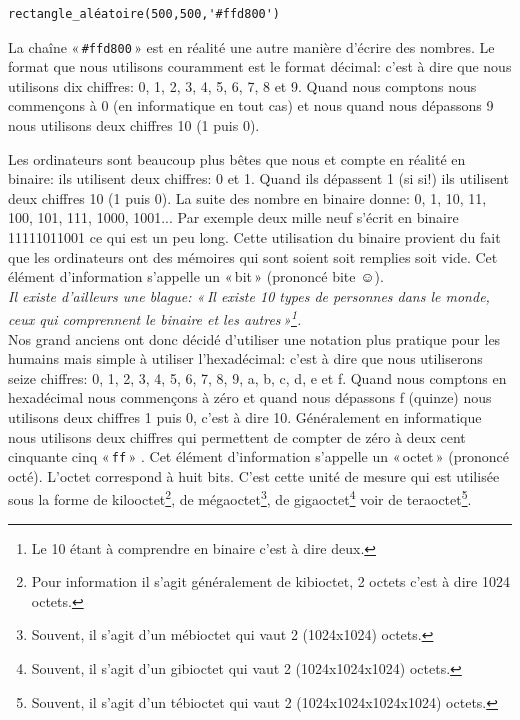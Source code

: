 \begin{Verbatim}[frame=single,rulecolor=\color{mbleu}, label=à taper]
rectangle_aléatoire(500,500,'#ffd800')
\end{Verbatim}

La chaîne « \texttt{\#ffd800} » est en réalité une autre manière d'écrire des nombres.
Le format que nous utilisons couramment est le format décimal: c'est à dire que nous utilisons dix chiffres: 0, 1, 2, 3, 4, 5, 6, 7, 8 et 9. Quand nous comptons nous commençons à 0 (en informatique en tout cas) et nous quand nous dépassons 9 nous utilisons deux chiffres 10 (1 puis 0).

Les ordinateurs sont beaucoup plus bêtes que nous et compte en réalité en binaire: ils utilisent deux chiffres: 0 et 1. Quand ils dépassent 1 (si si!) ils utilisent deux chiffres 10 (1 puis 0). La suite des nombre en binaire donne: 0, 1, 10, 11, 100, 101, 111, 1000, 1001... Par exemple deux mille neuf s'écrit en binaire 11111011001 ce qui est un peu long. Cette utilisation du binaire provient du fait que les ordinateurs ont des mémoires qui sont soient soit remplies soit vide. Cet élément d'information s'appelle un « bit » (prononcé bite ☺).\\

\emph{Il existe d'ailleurs une blague: « Il existe \emph{10} types de personnes dans le monde, ceux qui comprennent le binaire et les autres »\footnote{Le 10 étant à comprendre en binaire c'est à dire deux.}.}\\


Nos grand anciens ont donc décidé d'utiliser une notation plus pratique pour les humains mais simple à utiliser l'hexadécimal: c'est à dire que nous utiliserons seize chiffres: 0, 1, 2, 3, 4, 5, 6, 7, 8, 9, a, b, c, d, e et f. Quand nous comptons en hexadécimal nous commençons à zéro et quand nous dépassons f (quinze) nous utilisons deux chiffres 1 puis 0, c'est à dire 10. Généralement en informatique nous utilisons deux chiffres qui permettent de compter de zéro à deux cent cinquante cinq « \texttt{ff} » .
Cet élément d'information s'appelle un « octet » (prononcé octé). L'octet correspond à huit bits. C'est cette unité de mesure qui est utilisée sous la forme de kilooctet\footnote{Pour information il s'agit généralement de kibioctet, 2 octets c'est à dire 1024 octets.}, de mégaoctet\footnote{Souvent, il s'agit d'un mébioctet qui vaut 2 (1024\textsf{x}1024) octets.}, de gigaoctet\footnote{Souvent, il s'agit d'un gibioctet qui vaut 2 (1024\textsf{x}1024\textsf{x}1024) octets.} voir de teraoctet\footnote{Souvent, il s'agit d'un tébioctet qui vaut 2 (1024\textsf{x}1024\textsf{x}1024\textsf{x}1024) octets.}.

